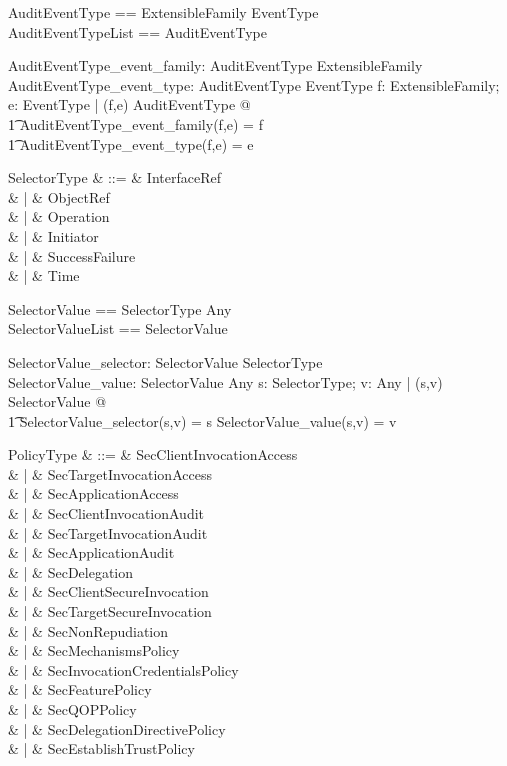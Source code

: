 \begin{zed}
  AuditEventType == ExtensibleFamily \cross EventType \\
  AuditEventTypeList == \seq AuditEventType
\end{zed}
\begin{axdef}
  AuditEventType\_event\_family: AuditEventType \fun ExtensibleFamily\\
  AuditEventType\_event\_type: AuditEventType \fun EventType
  \where
  \forall f: ExtensibleFamily; e: EventType | (f,e) \in AuditEventType @ \\
  \t1 AuditEventType\_event\_family(f,e) = f \\
  \t1 \land AuditEventType\_event\_type(f,e) = e
\end{axdef}
\begin{syntax}
  SelectorType & ::= & InterfaceRef\\
  & | & ObjectRef\\
  & | & Operation\\
  & | & Initiator\\
  & | & SuccessFailure\\
  & | & Time
\end{syntax}
  
\begin{zed}
  SelectorValue == SelectorType \cross Any \\
  SelectorValueList == \seq SelectorValue
\end{zed}
\begin{axdef}
  SelectorValue\_selector: SelectorValue \fun SelectorType\\
  SelectorValue\_value: SelectorValue \fun Any
  \where
  \forall s: SelectorType; v: Any | (s,v) \in SelectorValue @ \\
  \t1 SelectorValue\_selector(s,v) = s \land SelectorValue\_value(s,v) = v
\end{axdef}
\begin{syntax}
  PolicyType & ::= & SecClientInvocationAccess\\
  & | & SecTargetInvocationAccess\\
  & | & SecApplicationAccess\\
  & | & SecClientInvocationAudit\\
  & | & SecTargetInvocationAudit\\
  & | & SecApplicationAudit\\
  & | & SecDelegation\\
  & | & SecClientSecureInvocation\\
  & | & SecTargetSecureInvocation\\
  & | & SecNonRepudiation\\
  & | & SecMechanismsPolicy\\
  & | & SecInvocationCredentialsPolicy\\
  & | & SecFeaturePolicy\\
  & | & SecQOPPolicy \\
  & | & SecDelegationDirectivePolicy \\
  & | & SecEstablishTrustPolicy \\
\end{syntax}
